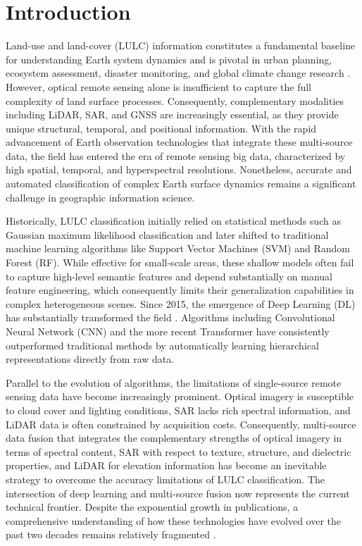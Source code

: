 \documentclass[]{interact}
\theoremstyle{plain}%
\theoremstyle{definition}
\theoremstyle{remark}
\begin{document}
\section{Introduction}

Land-use and land-cover (LULC) information constitutes a fundamental baseline for understanding Earth system dynamics and is pivotal in urban planning, ecosystem assessment, disaster monitoring, and global climate change research \citep{ORIG1}. However, optical remote sensing alone is insufficient to capture the full complexity of land surface processes. Consequently, complementary modalities including LiDAR, SAR, and GNSS are increasingly essential, as they provide unique structural, temporal, and positional information. With the rapid advancement of Earth observation technologies that integrate these multi-source data, the field has entered the era of remote sensing big data, characterized by high spatial, temporal, and hyperspectral resolutions. Nonetheless, accurate and automated classification of complex Earth surface dynamics remains a significant challenge in geographic information science.


Historically, LULC classification initially relied on statistical methods such as Gaussian maximum likelihood classification and later shifted to traditional machine learning algorithms like Support Vector Machines (SVM) and Random Forest (RF). While effective for small-scale areas, these shallow models often fail to capture high-level semantic features and depend substantially on manual feature engineering, which consequently limits their generalization capabilities in complex heterogeneous scenes. Since 2015, the emergence of Deep Learning (DL) has substantially transformed the field \citep{2}. Algorithms including Convolutional Neural Network (CNN) and the more recent Transformer have consistently outperformed traditional methods by automatically learning hierarchical representations directly from raw data.



Parallel to the evolution of algorithms, the limitations of single-source remote sensing data have become increasingly prominent. Optical imagery is susceptible to cloud cover and lighting conditions, SAR lacks rich spectral information, and LiDAR data is often constrained by acquisition costs. Consequently, multi-source data fusion that integrates the complementary strengths of optical imagery in terms of spectral content, SAR with respect to texture, structure, and dielectric properties, and LiDAR for elevation information has become an inevitable strategy to overcome the accuracy limitations of LULC classification. The intersection of deep learning and multi-source fusion now represents the current technical frontier. Despite the exponential growth in publications, a comprehensive understanding of how these technologies have evolved over the past two decades remains relatively fragmented \citep{5}.
\end{document}
